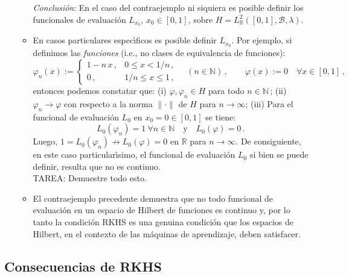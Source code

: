 \begin{enumerate}
\begin{itemize}
\smallskip
{\em Conclusi\'on\/}: En el caso del contraejemplo ni siquiera es
posible definir los funcionales de evaluaci\'on $L_{x_0}$,
$x_0\in[0,1]$, sobre $H=L_{\mathbb{R}}^2([0,1],\mathcal{B},\lambda)$.

\item
En casos particulares espec\'\i ficos es posible definir $L_{x_0}$.
Por ejemplo, si definimos las {\em funciones\/} (i.e., no clases
de equivalencia de funciones):
$$
\varphi_n(x):=
\begin{cases}
1-n\,x\,, & 0\leq x< 1/n\,, \\
0\,, & 1/n\leq x\leq 1\,,
\end{cases}
\quad (n\in\mathbb{N})\,,\qquad
\varphi(x):=0\quad\forall x\in[0,1]\,,
$$
entonces podemos constatar que:
(i) $\varphi,\varphi_n\in H$ para todo $n\in\mathbb{N}\,$;
(ii) $\varphi_n\to \varphi$ con respecto a la norma $\|\cdot\|$
     de $H$ para $n\to\infty$;
(iii) Para el funcional de evaluaci\'on $L_0$ en $x_0=0\in[0,1]$
      se tiene:
$$
L_0(\varphi_n)=1\ \forall n\in\mathbb{N}\quad\text{y}\quad
L_0(\varphi)=0\,.
$$
Luego, $1=L_0(\varphi_n)\not\to L_0(\varphi)=0$ en $\mathbb{R}$
para $n\to\infty$.
De consiguiente, en este caso particular\'\i simo, el funcional de
evaluaci\'on $L_0$ si bien se puede definir, resulta que no es
continuo. \\
TAREA: Demuestre todo esto.

\item
El contraejemplo precedente demuestra que no todo funcional de
evaluaci\'on en un espacio de Hilbert de funciones es continuo y,
por lo tanto la condici\'on RKHS es una genuina condici\'on que
los espacios de Hilbert, en el contexto de las m\'aquinas de
aprendizaje, deben satisfacer.
\end{itemize}
\end{enumerate}



\subsection{Consecuencias de RKHS}

